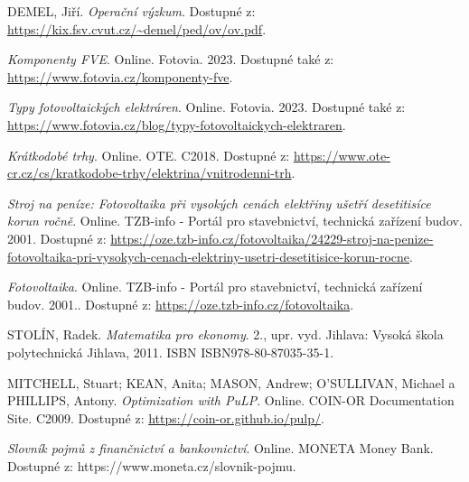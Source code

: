 \begin{thebibliography}{9}
    DEMEL, Jiří. \textit{Operační výzkum}. Dostupné z: \url{https://kix.fsv.cvut.cz/~demel/ped/ov/ov.pdf}.
    
    \textit{Komponenty FVE}. Online. Fotovia. 2023. Dostupné také z: \url{https://www.fotovia.cz/komponenty-fve}.
    
    \textit{Typy fotovoltaických elektráren}. Online. Fotovia. 2023. Dostupné také z: \url{https://www.fotovia.cz/blog/typy-fotovoltaickych-elektraren}.
    
    \textit{Krátkodobé trhy}. Online. OTE. C2018. Dostupné z: \url{https://www.ote-cr.cz/cs/kratkodobe-trhy/elektrina/vnitrodenni-trh}.
    
    \textit{Stroj na peníze: Fotovoltaika při vysokých cenách elektřiny ušetří desetitisíce korun ročně}. Online. TZB-info - Portál pro stavebnictví, technická zařízení budov. 2001. Dostupné z: \url{https://oze.tzb-info.cz/fotovoltaika/24229-stroj-na-penize-fotovoltaika-pri-vysokych-cenach-elektriny-usetri-desetitisice-korun-rocne}.

    \textit{Fotovoltaika}. Online. TZB-info - Portál pro stavebnictví, technická zařízení budov. 2001.. Dostupné z: \url{https://oze.tzb-info.cz/fotovoltaika}.

    STOLÍN, Radek. \textit{Matematika pro ekonomy}. 2., upr. vyd. Jihlava: Vysoká škola polytechnická Jihlava, 2011. ISBN ISBN978-80-87035-35-1.

    MITCHELL, Stuart; KEAN, Anita; MASON, Andrew; O'SULLIVAN, Michael a PHILLIPS, Antony. \textit{Optimization with PuLP}. Online. COIN-OR Documentation Site. C2009. Dostupné z: \url{https://coin-or.github.io/pulp/}.
    
    \textit{Slovník pojmů z finančnictví a bankovnictví}. Online. MONETA Money Bank. Dostupné z: https://www.moneta.cz/slovnik-pojmu.

\end{thebibliography}
